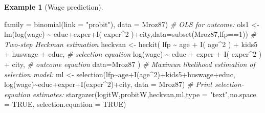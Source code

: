 \documentclass[
  12pt,
]{book}
\newenvironment{Shaded}{\begin{snugshade}}{\end{snugshade}}
\newcommand{\AttributeTok}[1]{\textcolor[rgb]{0.77,0.63,0.00}{#1}}
\newcommand{\CommentTok}[1]{\textcolor[rgb]{0.56,0.35,0.01}{\textit{#1}}}
\newcommand{\ConstantTok}[1]{\textcolor[rgb]{0.00,0.00,0.00}{#1}}
\newcommand{\DecValTok}[1]{\textcolor[rgb]{0.00,0.00,0.81}{#1}}
\newcommand{\FunctionTok}[1]{\textcolor[rgb]{0.00,0.00,0.00}{#1}}
\newcommand{\NormalTok}[1]{#1}
\newcommand{\OtherTok}[1]{\textcolor[rgb]{0.56,0.35,0.01}{#1}}
\newcommand{\SpecialCharTok}[1]{\textcolor[rgb]{0.00,0.00,0.00}{#1}}
\newcommand{\StringTok}[1]{\textcolor[rgb]{0.31,0.60,0.02}{#1}}
\theoremstyle{definition}
\theoremstyle{definition}
\newtheorem{example}{Example}[chapter]
\theoremstyle{definition}
\theoremstyle{definition}
\theoremstyle{remark}
\begin{document}
\begin{example}[Wage prediction]
\begin{Shaded}
\begin{Highlighting}[]
               \AttributeTok{family =} \FunctionTok{binomial}\NormalTok{(}\AttributeTok{link =} \StringTok{"probit"}\NormalTok{), }\AttributeTok{data =}\NormalTok{ Mroz87) }
\CommentTok{\# OLS for outcome:}
\NormalTok{ols1 }\OtherTok{\textless{}{-}} \FunctionTok{lm}\NormalTok{(}\FunctionTok{log}\NormalTok{(wage) }\SpecialCharTok{\textasciitilde{}}\NormalTok{ educ}\SpecialCharTok{+}\NormalTok{exper}\SpecialCharTok{+}\FunctionTok{I}\NormalTok{( exper}\SpecialCharTok{\^{}}\DecValTok{2}\NormalTok{ )}\SpecialCharTok{+}\NormalTok{city,}\AttributeTok{data=}\FunctionTok{subset}\NormalTok{(Mroz87,lfp}\SpecialCharTok{==}\DecValTok{1}\NormalTok{))}
\CommentTok{\# Two{-}step Heckman estimation}
\NormalTok{heckvan }\OtherTok{\textless{}{-}} 
  \FunctionTok{heckit}\NormalTok{( lfp }\SpecialCharTok{\textasciitilde{}}\NormalTok{ age }\SpecialCharTok{+} \FunctionTok{I}\NormalTok{( age}\SpecialCharTok{\^{}}\DecValTok{2}\NormalTok{ ) }\SpecialCharTok{+}\NormalTok{ kids5 }\SpecialCharTok{+}\NormalTok{ huswage }\SpecialCharTok{+}\NormalTok{ educ, }\CommentTok{\# selection equation}
          \FunctionTok{log}\NormalTok{(wage) }\SpecialCharTok{\textasciitilde{}}\NormalTok{ educ }\SpecialCharTok{+}\NormalTok{ exper }\SpecialCharTok{+} \FunctionTok{I}\NormalTok{( exper}\SpecialCharTok{\^{}}\DecValTok{2}\NormalTok{ ) }\SpecialCharTok{+}\NormalTok{ city, }\CommentTok{\# outcome equation}
          \AttributeTok{data=}\NormalTok{Mroz87 )}
\CommentTok{\# Maximun likelihood estimation of selection model:}
\NormalTok{ml }\OtherTok{\textless{}{-}} \FunctionTok{selection}\NormalTok{(lfp}\SpecialCharTok{\textasciitilde{}}\NormalTok{age}\SpecialCharTok{+}\FunctionTok{I}\NormalTok{(age}\SpecialCharTok{\^{}}\DecValTok{2}\NormalTok{)}\SpecialCharTok{+}\NormalTok{kids5}\SpecialCharTok{+}\NormalTok{huswage}\SpecialCharTok{+}\NormalTok{educ, }
                \FunctionTok{log}\NormalTok{(wage)}\SpecialCharTok{\textasciitilde{}}\NormalTok{educ}\SpecialCharTok{+}\NormalTok{exper}\SpecialCharTok{+}\FunctionTok{I}\NormalTok{(exper}\SpecialCharTok{\^{}}\DecValTok{2}\NormalTok{)}\SpecialCharTok{+}\NormalTok{city, }\AttributeTok{data =}\NormalTok{ Mroz87)}
\CommentTok{\# Print selection{-}equation estimates:}
\FunctionTok{stargazer}\NormalTok{(logitW,probitW,heckvan,ml,}\AttributeTok{type =} \StringTok{"text"}\NormalTok{,}\AttributeTok{no.space =} \ConstantTok{TRUE}\NormalTok{,}
          \AttributeTok{selection.equation =} \ConstantTok{TRUE}\NormalTok{)}
\end{Highlighting}
\end{Shaded}


\end{example}
\end{document}
